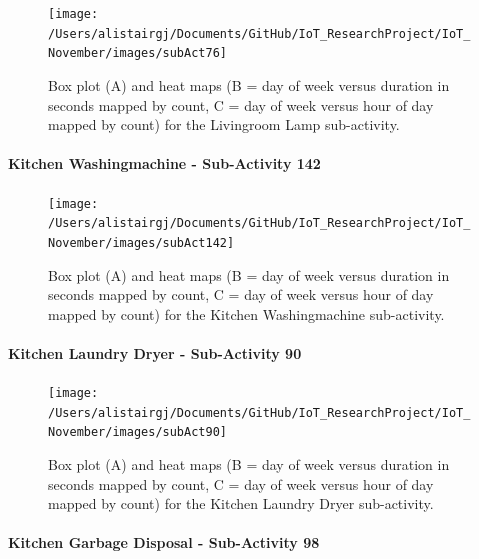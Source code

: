 \documentclass[11pt,]{article}
\let\oldparagraph\paragraph
\renewcommand{\paragraph}[1]{\oldparagraph{#1}\mbox{}}
\begin{document}
\begin{figure}[H]

{\centering \texttt{[image: /Users/alistairgj/Documents/GitHub/IoT\_ResearchProject/IoT\_November/images/subAct76]} 

}

\caption{Box plot (A) and heat maps (B = day of week versus duration in seconds mapped by count, C = day of week versus hour of day mapped by count) for the Livingroom Lamp sub-activity.}\label{fig:subAct76}
\end{figure}

\hypertarget{kitchen-washingmachine---sub-activity-142}{%
\paragraph{Kitchen Washingmachine - Sub-Activity
142}\label{kitchen-washingmachine---sub-activity-142}}

\begin{figure}[H]

{\centering \texttt{[image: /Users/alistairgj/Documents/GitHub/IoT\_ResearchProject/IoT\_November/images/subAct142]} 

}

\caption{Box plot (A) and heat maps (B = day of week versus duration in seconds mapped by count, C = day of week versus hour of day mapped by count) for the Kitchen Washingmachine sub-activity.}\label{fig:subAct142}
\end{figure}

\hypertarget{kitchen-laundry-dryer---sub-activity-90}{%
\paragraph{Kitchen Laundry Dryer - Sub-Activity
90}\label{kitchen-laundry-dryer---sub-activity-90}}

\begin{figure}[H]

{\centering \texttt{[image: /Users/alistairgj/Documents/GitHub/IoT\_ResearchProject/IoT\_November/images/subAct90]} 

}

\caption{Box plot (A) and heat maps (B = day of week versus duration in seconds mapped by count, C = day of week versus hour of day mapped by count) for the Kitchen Laundry Dryer sub-activity.}\label{fig:subAct90}
\end{figure}

\hypertarget{kitchen-garbage-disposal---sub-activity-98}{%
\paragraph{Kitchen Garbage Disposal - Sub-Activity
98}\label{kitchen-garbage-disposal---sub-activity-98}}
\end{document}
